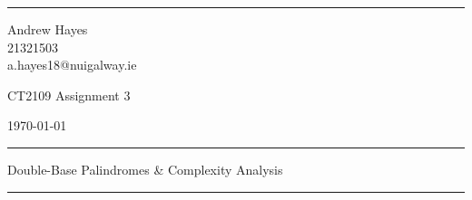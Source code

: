 \documentclass[a4paper]{article}
\begin{document}

\fancyhead[C]{}
\hrule \medskip %
\begin{minipage}{0.295\textwidth} 
    \begin{raggedright}
        \footnotesize
        Andrew Hayes \hfill\\   
        21321503 \hfill\\
        a.hayes18@nuigalway.ie 
    \end{raggedright}
\end{minipage}
\begin{minipage}{0.4\textwidth} 
    \begin{centering}
        \large 
        CT2109 Assignment 3\\ 
        \normalsize 
    \end{centering}
\end{minipage}
\begin{minipage}{0.295\textwidth} 
    \begin{raggedleft}
        \footnotesize
        \today \hfill\\
    \end{raggedleft}
\end{minipage}

\medskip\hrule 
\medskip
\begin{centering}
    Double-Base Palindromes \& Complexity Analysis\\ 
\end{centering}
\medskip\hrule 
\bigskip
\end{document}
